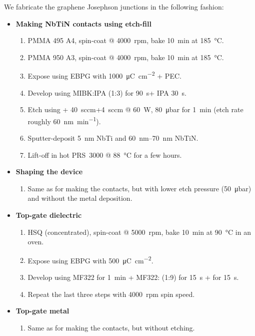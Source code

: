We fabricate the graphene Josephson junctions in the following fashion:
%
\begin{itemize}
	\item \textbf{Making NbTiN contacts using etch-fill}
	\begin{enumerate}
		\item PMMA 495 A4, spin-coat @ \SI{4000}{rpm}, bake \SI{10}{\minute} at \SI{185}{\celsius}.
		\label{etch-fill-start}
		\item PMMA 950 A3, spin-coat @ \SI{4000}{rpm}, bake \SI{10}{\minute} at \SI{185}{\celsius}.
		\item Expose using EBPG with \SI{1000}{\micro\coulomb\per\centi\meter\squared} + PEC.
		\item Develop using MIBK:IPA (1:3) for \SI{90}{\second}+ IPA \SI{30}{\second}.
		\label{etch-fill-stop}
		\item Etch using + \SI{40}{sccm}+\SI{4}{sccm} @ \SI{60}{\watt}, \SI{80}{\micro\bar} for \SI{1}{\minute} (etch rate roughly \SI{60}{\nano\meter\per\minute}).
		\item Sputter-deposit \SI{5}{\nano\meter} NbTi and \SIrange{60}{70}{\nano\meter} NbTiN.
		\item Lift-off in hot PRS~3000 @ \SI{88}{\celsius} for a few hours.
	\end{enumerate}
	\item \textbf{Shaping the device}
	\begin{enumerate}
		\item Same as for making the contacts, but with lower etch pressure (\SI{50}{\micro\bar}) and without the metal deposition.
	\end{enumerate}
	\item \textbf{Top-gate dielectric}
	\begin{enumerate}
		\item HSQ (concentrated), spin-coat @ \SI{5000}{rpm}, bake \SI{10}{\minute} at \SI{90}{\celsius} in an oven.
		\item Expose using EBPG with \SI{500}{\micro\coulomb\per\centi\meter\squared}.
		\item Develop using MF322 for \SI{1}{\minute} + MF322: (1:9) for \SI{15}{\second} +  for \SI{15}{\second}.
		\item Repeat the last three steps with \SI{4000}{rpm} spin speed.
	\end{enumerate}
	\item \textbf{Top-gate metal}
	\begin{enumerate}
		\item Same as for making the contacts, but without etching.
	\end{enumerate}
\end{itemize}

